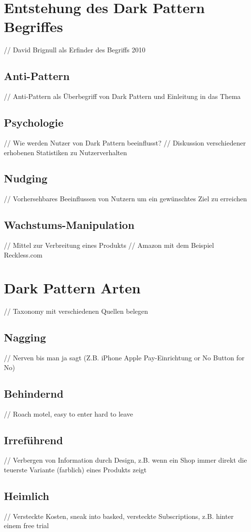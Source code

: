 \documentclass[conference,compsoc,final,a4paper]{IEEEtran}
\begin{document}
\section{Entstehung des Dark Pattern Begriffes}
// David Brignull als Erfinder des Begriffs 2010
\subsection{Anti-Pattern}
// Anti-Pattern als Überbegriff von Dark Pattern und Einleitung in das Thema
\subsection{Psychologie}
// Wie werden Nutzer von Dark Pattern beeinflusst?
// Diskussion verschiedener erhobenen Statistiken zu Nutzerverhalten
\subsection{Nudging}
// Vorhersehbares Beeinflussen von Nutzern um ein gewünschtes Ziel zu erreichen
\subsection{Wachstums-Manipulation}
// Mittel zur Verbreitung eines Produkts
// Amazon mit dem Beispiel Reckless.com

\section{Dark Pattern Arten}
// Taxonomy mit verschiedenen Quellen belegen
\subsection{Nagging}
// Nerven bis man ja sagt (Z.B. iPhone Apple Pay-Einrichtung or No Button for No)
\subsection{Behindernd}
// Roach motel, easy to enter hard to leave
\subsection{Irreführend}
// Verbergen von Information durch Design, z.B. wenn ein Shop immer direkt die teuerste Variante (farblich) eines Produkts zeigt
\subsection{Heimlich}
// Versteckte Kosten, sneak into basked, versteckte Subscriptions, z.B. hinter einem free trial
\end{document}
